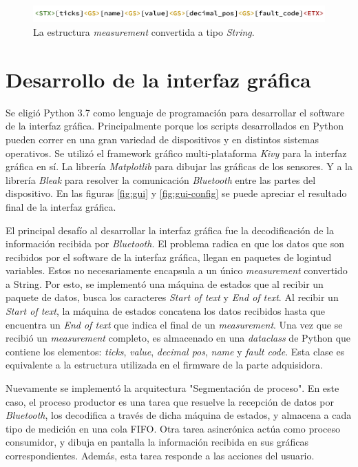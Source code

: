 \begin{figure}[htpb]
\centering
\includegraphics[width=.9\textwidth]{./Figures/measurement-string.png}
\caption{La estructura \textit{measurement} convertida a tipo \textit{String}.}
\label{fig:measurement-string}
\end{figure}


\section{Desarrollo de la interfaz gráfica}

Se eligió Python 3.7 como lenguaje de programación para desarrollar el software de la interfaz gráfica. Principalmente porque los scripts desarrollados en Python pueden correr en una gran variedad de dispositivos y en distintos sistemas operativos. Se utilizó el framework gráfico multi-plataforma \textit{Kivy} para la interfaz gráfica en sí. La librería \textit{Matplotlib} para dibujar las gráficas de los sensores. Y a la librería \textit{Bleak} para resolver la comunicación \textit{Bluetooth} entre las partes del dispositivo. En las figuras \ref{fig:gui} y \ref{fig:gui-config} se puede apreciar el resultado final de la interfaz gráfica.

El principal desafío al desarrollar la interfaz gráfica fue la decodificación de la información recibida por \textit{Bluetooth}. 
El problema radica en que los datos que son recibidos por el software de la interfaz gráfica, llegan en paquetes de logintud variables. Estos no necesariamente encapsula a un único \textit{measurement} convertido a String. Por esto, se implementó una máquina de estados que al recibir un paquete de datos, busca los caracteres \textit{Start of text} y \textit{End of text}. Al recibir un \textit{Start of text}, la máquina de estados concatena los datos recibidos hasta que encuentra un \textit{End of text} que indica el final de un \textit{measurement}. Una vez que se recibió un \textit{measurement} completo, es almacenado en una \textit{dataclass} de Python que contiene los elementos: \textit{ticks}, \textit{value}, \textit{decimal pos}, \textit{name} y \textit{fault code}. Esta clase es equivalente a la estructura utilizada en el firmware de la parte adquisidora.

Nuevamente se implementó la arquitectura "Segmentación de proceso". En este caso, el proceso productor es una tarea que resuelve la recepción de datos por \textit{Bluetooth}, los decodifica a través de dicha máquina de estados, y almacena a cada tipo de medición en una cola FIFO. Otra tarea asincrónica actúa como proceso consumidor, y dibuja en pantalla la información recibida en sus gráficas correspondientes. Además, esta tarea responde a las acciones del usuario.

